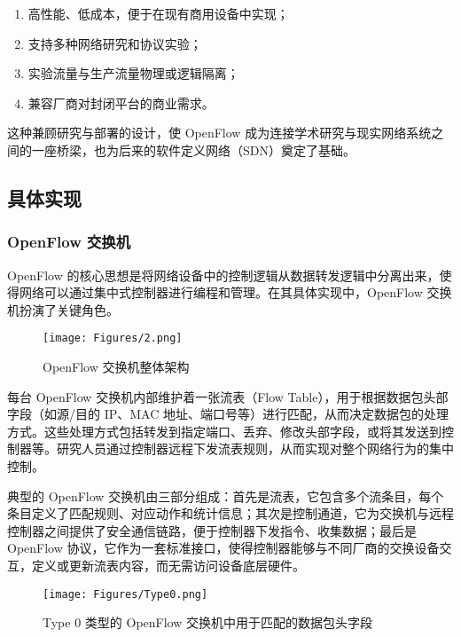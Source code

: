 \documentclass{article}
\begin{document}
\begin{enumerate}
  \item 高性能、低成本，便于在现有商用设备中实现；
  \item 支持多种网络研究和协议实验；
  \item 实验流量与生产流量物理或逻辑隔离；
  \item 兼容厂商对封闭平台的商业需求。
\end{enumerate}


这种兼顾研究与部署的设计，使 OpenFlow 成为连接学术研究与现实网络系统之间的一座桥梁，也为后来的软件定义网络（SDN）奠定了基础。

\subsection{\textbf{具体实现}}

\subsubsection{\textbf{OpenFlow 交换机}}


\quad\quad  OpenFlow 的核心思想是将网络设备中的控制逻辑从数据转发逻辑中分离出来，使得网络可以通过集中式控制器进行编程和管理。在其具体实现中，OpenFlow 交换机扮演了关键角色。



\begin{figure}[h]
    \centering
    \texttt{[image: Figures/2.png]}
    \caption{OpenFlow 交换机整体架构}
\end{figure}


每台 OpenFlow 交换机内部维护着一张流表（Flow Table），用于根据数据包头部字段（如源/目的 IP、MAC 地址、端口号等）进行匹配，从而决定数据包的处理方式。这些处理方式包括转发到指定端口、丢弃、修改头部字段，或将其发送到控制器等。研究人员通过控制器远程下发流表规则，从而实现对整个网络行为的集中控制。

典型的 OpenFlow 交换机由三部分组成：首先是流表，它包含多个流条目，每个条目定义了匹配规则、对应动作和统计信息；其次是控制通道，它为交换机与远程控制器之间提供了安全通信链路，便于控制器下发指令、收集数据；最后是 OpenFlow 协议，它作为一套标准接口，使得控制器能够与不同厂商的交换设备交互，定义或更新流表内容，而无需访问设备底层硬件。


\begin{figure}[h]
    \centering
    \texttt{[image: Figures/Type0.png]}
    \caption{Type 0 类型的 OpenFlow 交换机中用于匹配的数据包头字段}
\end{figure}
\end{document}
